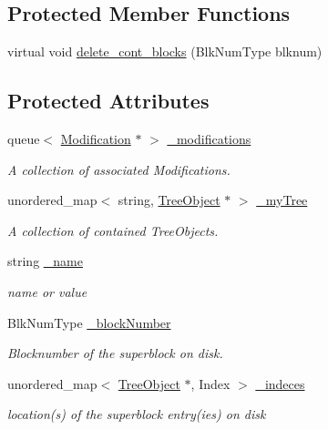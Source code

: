 \subsection*{Protected Member Functions}
\begin{DoxyCompactItemize}
\item 
virtual void \mbox{\hyperlink{class_tree_object_a07f5f5de1cff0cfdc2372e81559f5181}{delete\+\_\+cont\+\_\+blocks}} (Blk\+Num\+Type blknum)
\end{DoxyCompactItemize}
\subsection*{Protected Attributes}
\begin{DoxyCompactItemize}
\item 
queue$<$ \mbox{\hyperlink{class_modification}{Modification}} $\ast$ $>$ \mbox{\hyperlink{class_tree_object_ac285793f5d7cba8069670210606c66c7}{\+\_\+modifications}}
\begin{DoxyCompactList}\small\item\em A collection of associated Modifications. \end{DoxyCompactList}\item 
unordered\+\_\+map$<$ string, \mbox{\hyperlink{class_tree_object}{Tree\+Object}} $\ast$ $>$ \mbox{\hyperlink{class_tree_object_a59effca19a3475c84496c7f82c856d38}{\+\_\+my\+Tree}}
\begin{DoxyCompactList}\small\item\em A collection of contained Tree\+Objects. \end{DoxyCompactList}\item 
string \mbox{\hyperlink{class_tree_object_a368b410ed9b21c7106babf2ba93399b3}{\+\_\+name}}
\begin{DoxyCompactList}\small\item\em name or value \end{DoxyCompactList}\item 
Blk\+Num\+Type \mbox{\hyperlink{class_tree_object_a17cfa5bde700978b4ec326909362bd2c}{\+\_\+block\+Number}}
\begin{DoxyCompactList}\small\item\em Blocknumber of the superblock on disk. \end{DoxyCompactList}\item 
unordered\+\_\+map$<$ \mbox{\hyperlink{class_tree_object}{Tree\+Object}} $\ast$, Index $>$ \mbox{\hyperlink{class_tree_object_ae79eb5bd12c820b50f5d10c3f9b5dc66}{\+\_\+indeces}}
\begin{DoxyCompactList}\small\item\em location(s) of the superblock entry(ies) on disk \end{DoxyCompactList}\item 

\end{DoxyCompactItemize}
